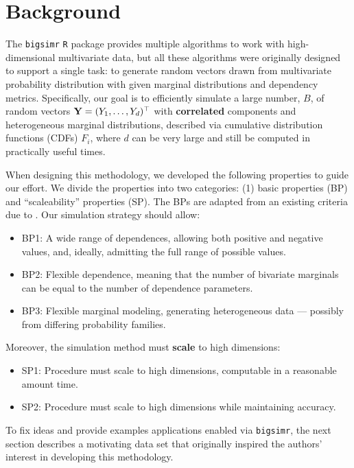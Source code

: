\documentclass[]{article}
\providecommand{\tightlist}{%
  \setlength{\itemsep}{0pt}\setlength{\parskip}{0pt}}
\begin{document}
\hypertarget{background}{%
\section{Background}\label{background}}

The \texttt{bigsimr} \texttt{R} package provides multiple algorithms to work with high-dimensional multivariate data, but all these algorithms were originally designed to support a single task:
to generate random vectors drawn from multivariate probability distribution with given marginal distributions and dependency metrics.
Specifically, our goal is to efficiently simulate a large number, \(B\), of random vectors \({\bf Y}=(Y_1, \ldots, Y_d)^\top\) with \textbf{correlated} components and heterogeneous marginal distributions, described via cumulative distribution functions (CDFs) \(F_i\), where \(d\) can be very large and still be computed in practically useful times.

When designing this methodology, we developed the following properties to guide our effort.
We divide the properties into two categories: (1) basic properties (BP) and ``scaleability'' properties (SP).
The BPs are adapted from an existing criteria due to \citet{Nik13a}.
Our simulation strategy should allow:

\begin{itemize}
\tightlist
\item
  BP1: A wide range of dependences, allowing both positive and negative values, and, ideally, admitting the full range of possible values.
\item
  BP2: Flexible dependence, meaning that the number of bivariate marginals can be equal to the number of dependence parameters.
\item
  BP3: Flexible marginal modeling, generating heterogeneous data --- possibly from differing probability families.
\end{itemize}

Moreover, the simulation method must \textbf{scale} to high dimensions:

\begin{itemize}
\tightlist
\item
  SP1: Procedure must scale to high dimensions, computable in a reasonable amount time.
\item
  SP2: Procedure must scale to high dimensions while maintaining accuracy.
\end{itemize}

To fix ideas and provide examples applications enabled via \texttt{bigsimr}, the next section describes a motivating data set that originally inspired the authors' interest in developing this methodology.
\end{document}
